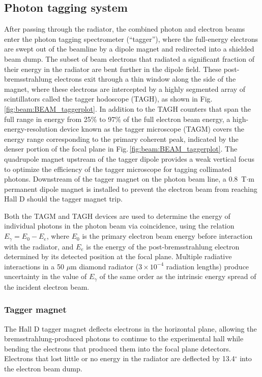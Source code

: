 \subsection{Photon tagging system \label{sec:tag}}
After passing through the radiator, the combined photon and electron beams enter
the photon tagging spectrometer (``tagger''), where the full-energy electrons are swept out of
the beamline by a dipole magnet and redirected into a shielded beam dump. The
subset of beam electrons that radiated a significant fraction of their energy in
the radiator are bent further in the dipole field. 
These post-brems\-strah\-lung electrons exit through a thin window
along the side of the magnet, where these
electrons are intercepted by a highly segmented
array of scintillators called the tagger hodoscope (TAGH), as shown in
Fig.\,\ref{fig:beam:BEAM_taggerplot}. In addition to the TAGH counters that span
the full range in energy from 25\% to 97\% of the full electron beam energy, a high-energy-resolution device known as the tagger microscope (TAGM) covers the
energy range corresponding to the primary coherent peak, indicated by the denser
portion of the focal plane in Fig.\,\ref{fig:beam:BEAM_taggerplot}. 
The quadrupole magnet upstream of the tagger dipole provides a weak vertical focus
to optimize the efficiency of the tagger microscope for tagging collimated photons.
Downstream of the tagger magnet
on the photon beam line, a 0.8~T$\cdot$m permanent dipole magnet is installed to prevent the electron beam from reaching
Hall D should the tagger magnet trip.

Both the TAGM and TAGH devices are used to determine the energy of individual
photons in the photon beam via coincidence, using
the relation $E_{\gamma} = E_{0} - E_{e}$, where $E_{0}$ is the primary electron
beam energy before interaction with the radiator, and $E_{e}$ is the
energy of the post-brems\-strah\-lung electron determined by its detected position at the
focal plane. Multiple radiative interactions in a 50 $\mu$m diamond radiator
($3\times 10^{-4}$ radiation lengths) produce uncertainty in the value of
$E_{\gamma}$ of the same order as the intrinsic energy spread of the incident
electron beam.

\subsubsection{Tagger magnet \label{sec:tagMagnet}}
The Hall D tagger magnet deflects electrons in the horizontal plane, allowing the
brems\-strah\-lung-produced photons to continue to the experimental hall while
bending the electrons that produced them into the focal plane detectors.
Electrons that lost little or no energy in the
radiator are deflected by 13.4$^\circ$ into the electron beam dump.

